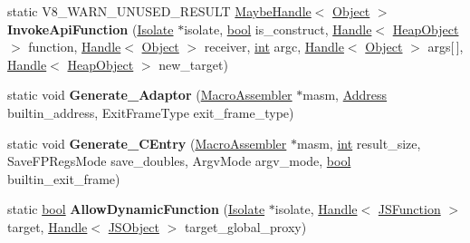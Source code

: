 \begin{DoxyCompactItemize}
\item 
\mbox{\label{classv8_1_1internal_1_1Builtins_ae0b1d40df5f7bb73159ba36c76fc3b47}} 
static V8\+\_\+\+W\+A\+R\+N\+\_\+\+U\+N\+U\+S\+E\+D\+\_\+\+R\+E\+S\+U\+LT \mbox{\hyperlink{classv8_1_1internal_1_1MaybeHandle}{Maybe\+Handle}}$<$ \mbox{\hyperlink{classv8_1_1internal_1_1Object}{Object}} $>$ {\bfseries Invoke\+Api\+Function} (\mbox{\hyperlink{classv8_1_1internal_1_1Isolate}{Isolate}} $\ast$isolate, \mbox{\hyperlink{classbool}{bool}} is\+\_\+construct, \mbox{\hyperlink{classv8_1_1internal_1_1Handle}{Handle}}$<$ \mbox{\hyperlink{classv8_1_1internal_1_1HeapObject}{Heap\+Object}} $>$ function, \mbox{\hyperlink{classv8_1_1internal_1_1Handle}{Handle}}$<$ \mbox{\hyperlink{classv8_1_1internal_1_1Object}{Object}} $>$ receiver, \mbox{\hyperlink{classint}{int}} argc, \mbox{\hyperlink{classv8_1_1internal_1_1Handle}{Handle}}$<$ \mbox{\hyperlink{classv8_1_1internal_1_1Object}{Object}} $>$ args\mbox{[}$\,$\mbox{]}, \mbox{\hyperlink{classv8_1_1internal_1_1Handle}{Handle}}$<$ \mbox{\hyperlink{classv8_1_1internal_1_1HeapObject}{Heap\+Object}} $>$ new\+\_\+target)
\item 
\mbox{\label{classv8_1_1internal_1_1Builtins_addd001b484dc39c991298c3074bac231}} 
static void {\bfseries Generate\+\_\+\+Adaptor} (\mbox{\hyperlink{classv8_1_1internal_1_1MacroAssembler}{Macro\+Assembler}} $\ast$masm, \mbox{\hyperlink{classuintptr__t}{Address}} builtin\+\_\+address, Exit\+Frame\+Type exit\+\_\+frame\+\_\+type)
\item 
\mbox{\label{classv8_1_1internal_1_1Builtins_aa2dfbd7f7db60623d37a24bc8f384926}} 
static void {\bfseries Generate\+\_\+\+C\+Entry} (\mbox{\hyperlink{classv8_1_1internal_1_1MacroAssembler}{Macro\+Assembler}} $\ast$masm, \mbox{\hyperlink{classint}{int}} result\+\_\+size, Save\+F\+P\+Regs\+Mode save\+\_\+doubles, Argv\+Mode argv\+\_\+mode, \mbox{\hyperlink{classbool}{bool}} builtin\+\_\+exit\+\_\+frame)
\item 
\mbox{\label{classv8_1_1internal_1_1Builtins_ae622b75b999f44d7cd2b02d9c4343a29}} 
static \mbox{\hyperlink{classbool}{bool}} {\bfseries Allow\+Dynamic\+Function} (\mbox{\hyperlink{classv8_1_1internal_1_1Isolate}{Isolate}} $\ast$isolate, \mbox{\hyperlink{classv8_1_1internal_1_1Handle}{Handle}}$<$ \mbox{\hyperlink{classv8_1_1internal_1_1JSFunction}{J\+S\+Function}} $>$ target, \mbox{\hyperlink{classv8_1_1internal_1_1Handle}{Handle}}$<$ \mbox{\hyperlink{classv8_1_1internal_1_1JSObject}{J\+S\+Object}} $>$ target\+\_\+global\+\_\+proxy)

\end{DoxyCompactItemize}
